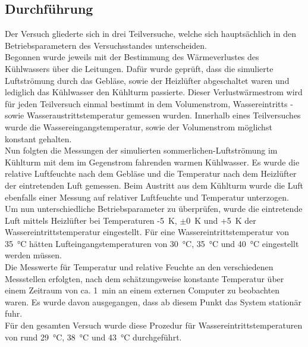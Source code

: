 \subsection*{Durchführung}
Der Versuch gliederte sich in drei Teilversuche, welche sich hauptsächlich in den Betriebsparametern des Versuchsstandes unterscheiden.\\
Begonnen wurde jeweils mit der Bestimmung des Wärmeverlustes des Kühlwassers über die Leitungen. Dafür wurde geprüft, dass die simulierte Luftströmung durch das Gebläse, sowie der Heizlüfter  abgeschaltet waren und lediglich das Kühlwasser den Kühlturm passierte. Dieser Verlustwärmestrom wird für jeden Teilversuch einmal bestimmt  in dem Volumenstrom, Wassereintritts - sowie Wasseraustrittstemperatur gemessen wurden. Innerhalb eines Teilversuches wurde die Wassereingangstemperatur, sowie der Volumenstrom möglichst konstant gehalten.\\
Nun folgten die Messungen der simulierten sommerlichen-Luftströmung im Kühlturm mit dem im Gegenstrom fahrenden warmen Kühlwasser. Es wurde die relative Luftfeuchte nach dem Gebläse und die Temperatur nach dem Heizlüfter der eintretenden Luft gemessen. Beim Austritt aus dem Kühlturm wurde die Luft ebenfalls einer Messung auf relativer Luftfeuchte und Temperatur unterzogen.\\
Um nun unterschiedliche Betriebsparameter zu überprüfen, wurde die eintretende Luft mittels Heizlüfter bei Temperaturen  -\SI{5}{\kelvin}, $\pm$\SI{0}{\kelvin} und +\SI{5}{\kelvin} der Wassereintrittstemperatur eingestellt. Für eine Wassereintrittstemperatur von \SI{35}{\celsius} hätten Lufteingangstemperaturen von \SI{30}{\celsius}, \SI{35}{\celsius} und \SI{40}{\celsius} eingestellt werden müssen.\\
Die Messwerte für Temperatur und relative Feuchte an den verschiedenen Messstellen erfolgten, nach dem schätzungsweise konstante Temperatur über einem Zeitraum von ca. \SI{1}{\minute} an einem externen Computer zu beobachten waren.  Es wurde davon ausgegangen, dass ab diesem Punkt das System stationär fuhr.\\

Für den gesamten Versuch wurde diese Prozedur für Wassereintrittstemperaturen von rund \SI{29}{\celsius}, \SI{38}{\celsius} und \SI{43}{\celsius} durchgeführt.